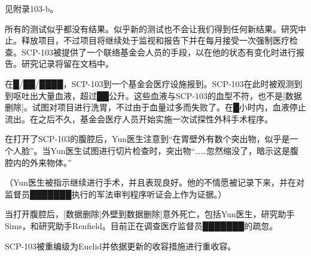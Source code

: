 见附录103-b。

所有的测试似乎都没有结果。似乎新的测试也不会让我们得到任何新结果。研究中止。释放项目，不过项目将继续处于监视和报告下并在每月接受一次强制医疗检查。SCP-103被提供了一个联络基金会人员的手段，以在他的状态有变化时进行报告。研究记录将留在文档中。

在█\slash ██\slash ████，SCP-103到一个基金会医疗设施报到。SCP-103在此时被观测到到呕吐出大量血液，超过██公升。这些血液与SCP-103的血型不符，也不是{[}数据删除]。试图对项目进行洗胃，不过由于血量过多而失败了。在█小时内，血液停止流出。在之后不久，基金会医疗人员开始实施一次试探性外科手术程序。

在打开了SCP-103的腹腔后，Yun医生注意到“在胃壁外有数个突出物，似乎是一个人脸”。当Yun医生试图进行切片检查时，突出物“……忽然缩没了，暗示这是腹腔内的外来物体。”

（Yun医生被指示继续进行手术，并且表现良好。他的不情愿被记录下来，并在对监督员███████执行的军法审判程序听证会上作为证据。）

当打开腹腔后，{[}数据删除]外壁到\ii{绦虫}{[}数据删除]意外死亡，包括Yun医生，研究助手Sims，和研究助手Renfield。目前正在调查医疗监督员███████的疏忽。

SCP-103被重编级为Euclid并依据更新的收容措施进行重收容。
